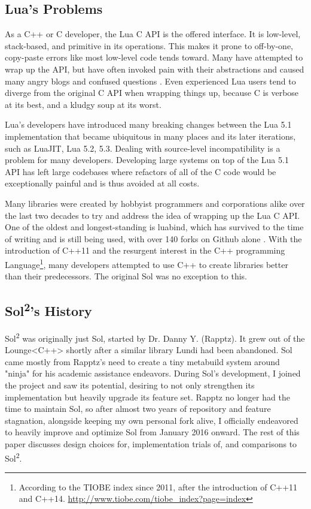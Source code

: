 \documentclass[conference,compsoc]{IEEEtran}
\newcommand{\loungecxx}{Lounge\textless{}C++\textgreater{}}
\newcommand{\soltwo}{Sol\textsuperscript{2}}
\begin{document}
\subsection{Lua's Problems}

As a C++ or C developer, the Lua C API is the offered interface. It is low-level, stack-based, and primitive in its operations. This makes it prone to off-by-one, copy-paste errors like most low-level code tends toward\cite{copy-paste-errors}. Many have attempted to wrap up the API, but have often invoked pain with their abstractions and caused many angry blogs and confused questions \cite{glue-rant}\cite{fun-lua-bindings}. Even experienced Lua users tend to diverge from the original C API when wrapping things up, because C is verbose at its best, and a kludgy soup at its worst\cite{conman-binding}.

Lua's developers have introduced many breaking changes between the Lua 5.1 implementation that became ubiquitous in many places and its later iterations, such as LuaJIT, Lua 5.2, 5.3. Dealing with source-level incompatibility is a problem for many developers\cite{api-evolution}. Developing large systems on top of the Lua 5.1 API has left large codebases where refactors of all of the C code would be exceptionally painful and is thus avoided at all costs.

Many libraries were created by hobbyist programmers and corporations alike over the last two decades to try and address the idea of wrapping up the Lua C API. One of the oldest and longest-standing is luabind, which has survived to the time of writing and is still being used, with over 140 forks on Github alone \cite{luabind}. With the introduction of C++11 and the resurgent interest in the C++ programming Language\footnote{According to the TIOBE index since 2011, after the introduction of C++11 and C++14. \url{http://www.tiobe.com/tiobe_index?page=index}}, many developers attempted to use C++ to create libraries better than their predecessors. The original Sol was no exception to this.

\subsection{\soltwo{}'s History}

\soltwo{} was originally just Sol, started by Dr. Danny Y. (Rapptz)\cite{sol}. It grew out of the \loungecxx{} shortly after a similar library Lundi\cite{lundi} had been abandoned. Sol came mostly from Rapptz's need to create a tiny metabuild system around "ninja"\cite{ninja} for his academic assistance endeavors. During Sol's development, I joined the project and saw its potential, desiring to not only strengthen its implementation but heavily upgrade its feature set. Rapptz no longer had the time to maintain Sol, so after almost two years of repository and feature stagnation, alongside keeping my own personal fork alive, I officially endeavored to heavily improve and optimize Sol from January 2016 onward. The rest of this paper discusses design choices for, implementation trials of, and comparisons to \soltwo{}.
\end{document}
